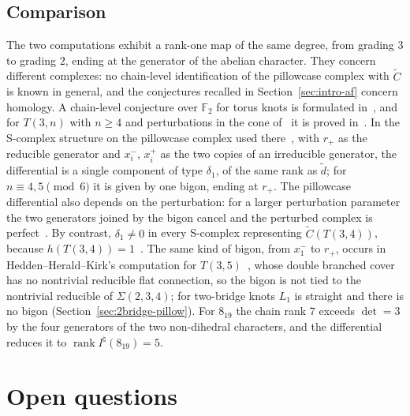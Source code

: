 \documentclass[11pt,reqno]{amsart}
\theoremstyle{plain}
\theoremstyle{definition}
\newcommand{\Inat}{I^{\natural}}
\newcommand{\Sig}{\Sigma}
\newcommand{\td}{\widetilde d}
\begin{document}
\subsection{Comparison}
The two computations exhibit a rank-one map of the same degree, from grading $3$ to grading $2$, ending at
the generator of the abelian character. They concern different complexes: no chain-level identification
of the pillowcase complex with $\widetilde C$ is known in general, and the conjectures recalled in
Section~\ref{sec:intro-af} concern homology. A chain-level conjecture over $\mathbb F_2$ for torus knots is
formulated in~\cite[Conj.~1.5]{WuebbenIV}, and for $T(3,n)$ with $n\ge4$ and perturbations in the cone
of~\cite[Def.~5.5]{WuebbenV} it is proved in~\cite[Thm.~1.3]{WuebbenV}. In the S-complex structure on the
pillowcase complex used there~\cite[\S1.3]{WuebbenIV}, with $r_+$ as the reducible generator and $x_i^-$, $x_i^+$
as the two copies of an irreducible generator, the differential is a single component of type $\delta_1$, of
the same rank as $\td$; for $n\equiv4,5\pmod6$ it is given by one bigon, ending at $r_+$. The pillowcase differential also depends on the perturbation: for a
larger perturbation parameter the two generators joined by the bigon cancel and the perturbed complex is
perfect~\cite[\S11.10, Prop.~11.1]{HHK2}. By contrast, $\delta_1\neq0$ in every S-complex representing
$\widetilde C(T(3,4))$, because $h(T(3,4))=1$~\cite[Prop.~4.15]{DSEquiv}. The same kind of bigon, from
$x_1^-$ to $r_+$, occurs in Hedden--Herald--Kirk's computation for $T(3,5)$~\cite[\S11.7]{HHK2}, whose
double branched cover has no nontrivial reducible flat connection, so the bigon is not tied to the nontrivial reducible of
$\Sig(2,3,4)$; for two-bridge knots $L_1$ is straight and there is no bigon
(Section~\ref{sec:2bridge-pillow}). For $8_{19}$ the chain rank $7$ exceeds $\det=3$ by the four generators
of the two non-dihedral characters, and the differential reduces it to $\operatorname{rank}\Inat(8_{19})=5$.

\section{Open questions}\label{sec:open}
\end{document}
